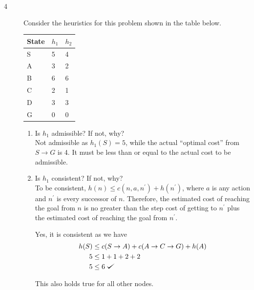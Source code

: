 \documentclass[11pt]{article}
\def\checkmark{\tikz\fill[scale=0.4](0,.35) -- (.25,0) -- (1,.7) -- (.25,.15) -- cycle;}
\begin{document}
  \begin{description}

\clearpage

  \item[4] Consider the heuristics for this problem shown in the table below.

     \begin{center}
     \begin{tabular}{|l|l|l|}\hline
     State & $h_1$ & $h_2$ \\ \hline
     S     & 5     & 4     \\ \hline
     A     & 3     & 2     \\ \hline
     B     & 6     & 6     \\ \hline
     C     & 2     & 1     \\ \hline
     D     & 3     & 3     \\ \hline
     G     & 0     & 0     \\ \hline
     \end{tabular}
     \end{center}

     \begin{enumerate}

     \item Is $h_1$ admissible?  If not, why? \\

       Not admissible as $h_{1}(S) = 5$, while the actual ``optimal cost'' from $S \rightarrow G$ is 4. It must be less than or equal to the actual cost to be admissible.

     \item Is $h_1$ consistent?  If not, why? \\

       To be consistent, $h(n) \leq c(n, a, n^{\prime}) + h(n^{\prime})$, where $a$ is any action and $n^{\prime}$ is every successor of $n$. Therefore, the estimated cost of reaching the goal from $n$ is no greater than the step cost of getting to $n^{\prime}$ plus the estimated cost of reaching the goal from $n^{\prime}$.

       Yes, it is consistent as we have 
       \begin{align*}
         h(S) &\leq c(S\rightarrow A) + c(A\rightarrow C \rightarrow G) + h(A)\\
         5 &\leq 1+1+2+2\\
         5 &\leq 6\;\checkmark
         \end{align*}

         This also holds true for all other nodes. 


\end{enumerate}
\end{description}
\end{document}
